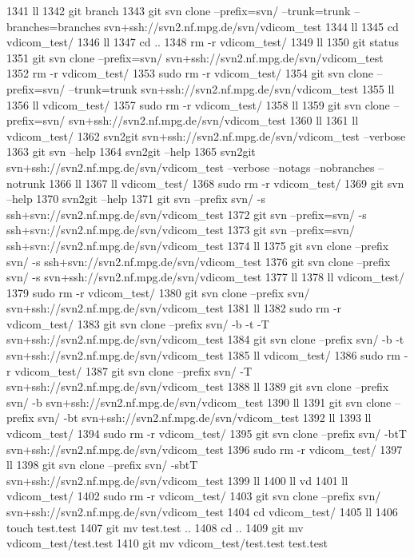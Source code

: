  1341  ll
 1342  git branch
 1343  git svn clone --prefix=svn/ --trunk=trunk --branches=branches svn+ssh://svn2.nf.mpg.de/svn/vdicom_test
 1344  ll
 1345  cd vdicom_test/
 1346  ll
 1347  cd ..
 1348  rm -r vdicom_test/
 1349  ll
 1350  git status
 1351  git svn clone --prefix=svn/ svn+ssh://svn2.nf.mpg.de/svn/vdicom_test
 1352  rm -r vdicom_test/
 1353  sudo rm -r vdicom_test/
 1354  git svn clone --prefix=svn/ --trunk=trunk svn+ssh://svn2.nf.mpg.de/svn/vdicom_test
 1355  ll
 1356  ll vdicom_test/
 1357  sudo rm -r vdicom_test/
 1358  ll
 1359  git svn clone --prefix=svn/ svn+ssh://svn2.nf.mpg.de/svn/vdicom_test
 1360  ll
 1361  ll vdicom_test/
 1362  svn2git svn+ssh://svn2.nf.mpg.de/svn/vdicom_test --verbose
 1363  git svn --help
 1364  svn2git --help
 1365  svn2git svn+ssh://svn2.nf.mpg.de/svn/vdicom_test --verbose --notags --nobranches --notrunk
 1366  ll
 1367  ll vdicom_test/
 1368  sudo rm -r vdicom_test/
 1369  git svn --help
 1370  svn2git --help
 1371  git svn --prefix svn/ -s ssh+svn://svn2.nf.mpg.de/svn/vdicom_test 
 1372  git svn --prefix=svn/ -s ssh+svn://svn2.nf.mpg.de/svn/vdicom_test 
 1373  git svn --prefix=svn/ ssh+svn://svn2.nf.mpg.de/svn/vdicom_test 
 1374  ll
 1375  git svn clone --prefix svn/ -s ssh+svn://svn2.nf.mpg.de/svn/vdicom_test 
 1376  git svn clone --prefix svn/ -s svn+ssh://svn2.nf.mpg.de/svn/vdicom_test 
 1377  ll
 1378  ll vdicom_test/
 1379  sudo rm -r vdicom_test/
 1380  git svn clone --prefix svn/ svn+ssh://svn2.nf.mpg.de/svn/vdicom_test 
 1381  ll
 1382  sudo rm -r vdicom_test/
 1383  git svn clone --prefix svn/ -b -t -T svn+ssh://svn2.nf.mpg.de/svn/vdicom_test 
 1384  git svn clone --prefix svn/ -b -t svn+ssh://svn2.nf.mpg.de/svn/vdicom_test 
 1385  ll vdicom_test/
 1386  sudo rm -r vdicom_test/
 1387  git svn clone --prefix svn/ -T svn+ssh://svn2.nf.mpg.de/svn/vdicom_test 
 1388  ll
 1389  git svn clone --prefix svn/ -b svn+ssh://svn2.nf.mpg.de/svn/vdicom_test 
 1390  ll
 1391  git svn clone --prefix svn/ -bt svn+ssh://svn2.nf.mpg.de/svn/vdicom_test 
 1392  ll
 1393  ll vdicom_test/
 1394  sudo rm -r vdicom_test/
 1395  git svn clone --prefix svn/ -btT svn+ssh://svn2.nf.mpg.de/svn/vdicom_test 
 1396  sudo rm -r vdicom_test/
 1397  ll
 1398  git svn clone --prefix svn/ -sbtT svn+ssh://svn2.nf.mpg.de/svn/vdicom_test 
 1399  ll
 1400  ll vd
 1401  ll vdicom_test/
 1402  sudo rm -r vdicom_test/
 1403  git svn clone --prefix svn/ svn+ssh://svn2.nf.mpg.de/svn/vdicom_test 
 1404  cd vdicom_test/
 1405  ll
 1406  touch test.test
 1407  git mv test.test ..
 1408  cd ..
 1409  git mv vdicom_test/test.test 
 1410  git mv vdicom_test/test.test test.test
